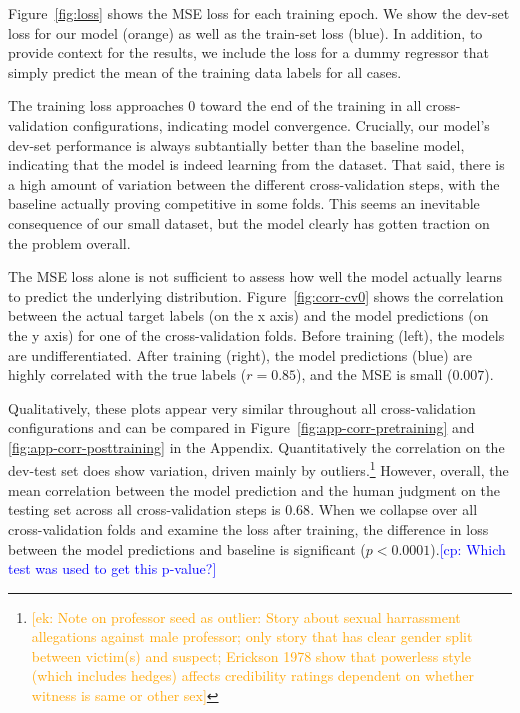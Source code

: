\documentclass[11pt,a4paper]{article}
\newcommand{\ek}[1]{\textcolor{Orange}{[ek: #1]}}
\newcommand{\cp}[1]{\textcolor{Blue}{[cp: #1]}}
\begin{document}
Figure~\ref{fig:loss} shows the MSE loss for each training epoch. We show the dev-set loss for our model (orange) as well as the train-set loss (blue). In addition, to provide context for the results, we include the loss for a dummy regressor that simply predict the mean of the training data labels for all cases.

The training loss approaches 0 toward the end of the training in all cross-validation configurations, indicating model convergence. Crucially, our model's dev-set performance is always subtantially better than the baseline model, indicating that the model is indeed learning from the dataset. That said, there is a high amount of variation between the different cross-validation steps, with the baseline actually proving competitive in some folds. This seems an inevitable consequence of our small dataset, but the model clearly has gotten traction on the problem overall.


The MSE loss alone is not sufficient to assess how well the model actually learns to predict the underlying distribution. Figure~\ref{fig:corr-cv0} shows the correlation between the actual target labels (on the x axis) and the model predictions (on the y axis) for one of the cross-validation folds. Before training (left), the models are undifferentiated. After training (right), the model predictions (blue) are highly correlated with the true labels ($r=0.85$), and the MSE is small ($0.007$).

Qualitatively, these plots appear very similar throughout all cross-validation configurations and can be compared in Figure~\ref{fig:app-corr-pretraining} and \ref{fig:app-corr-posttraining} in the Appendix. Quantitatively the correlation on the dev-test set does show variation, driven mainly by outliers.\footnote{\ek{Note on professor seed as outlier: Story about sexual harrassment allegations against male professor; only story that has clear gender split between victim(s) and suspect; Erickson 1978 show that powerless style (which includes hedges) affects credibility ratings dependent on whether witness is same or other sex}} However, overall, the mean correlation between the model prediction and the human judgment on the testing set across all cross-validation steps is $0.68$. When we collapse over all cross-validation folds and examine the loss after training, the difference in loss between the model predictions and baseline is significant ($p<0.0001$).\cp{Which test was used to get this p-value?}
\end{document}
